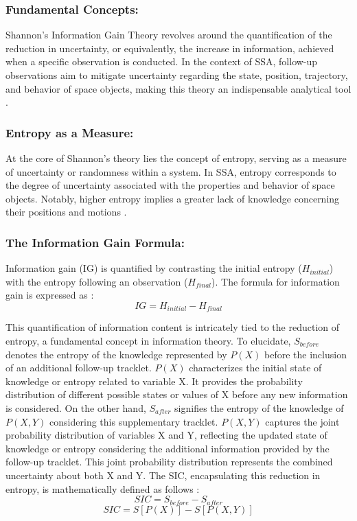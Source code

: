 \subsubsection{Fundamental Concepts:}
Shannon's Information Gain Theory revolves around the quantification of the reduction in uncertainty, or equivalently, the increase in information, achieved when a specific observation is conducted. In the context of SSA, follow-up observations aim 
to mitigate uncertainty regarding the state, position, trajectory, and behavior of space objects, making this theory an indispensable analytical tool \cite{IC,hinze1}.

\subsubsection{Entropy as a Measure:}
At the core of Shannon's theory lies the concept of entropy, serving as a measure of uncertainty or randomness within a system. In SSA, entropy corresponds to the degree of uncertainty associated with the properties and behavior of space objects. 
Notably, higher entropy implies a greater lack of knowledge concerning their positions and motions \cite{IC,hinze1}.

\subsubsection{The Information Gain Formula:}
Information gain (IG) is quantified by contrasting the initial entropy ($H_{initial}$) with the entropy following an observation ($H_{final}$). The formula for information gain is expressed as \cite{IC,hinze1}:
\begin{equation}
  IG = H_{initial} - H_{final}
\end{equation}

This quantification of information content is intricately tied to the reduction of entropy, a fundamental concept in information theory. To elucidate, $S_{before}$ denotes the entropy of the 
knowledge represented by $P(X)$ before the inclusion of an additional follow-up tracklet. $P(X)$ characterizes the initial state of knowledge or entropy related to variable X. It provides the probability distribution of different possible states or values of X before any new information is considered. On the other hand, $S_{after}$ signifies the entropy of the knowledge of $P(X, Y )$ considering this supplementary tracklet. 
$P(X, Y)$ captures the joint probability distribution of variables X and Y, reflecting the updated state of knowledge or entropy considering the additional information provided by the follow-up tracklet. This joint probability distribution represents the combined uncertainty about both X and Y. The SIC, encapsulating this reduction in entropy, is mathematically defined as follows \cite{IC,hinze1}:
\begin{equation}
  SIC=S_{before}-S_{after}
\end{equation}
\begin{equation}
  SIC=S[P(X)]-S[P(X,Y)]
\end{equation}

